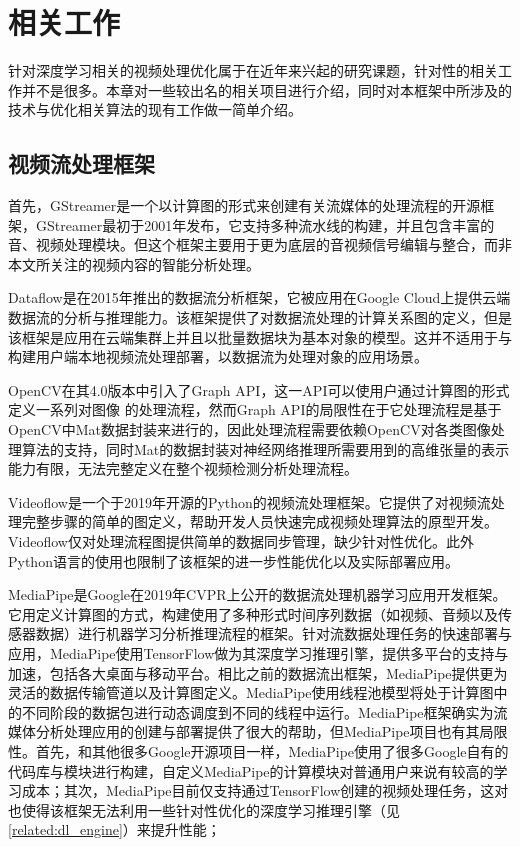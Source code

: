 
\chapter{相关工作}\label{related_work}
针对深度学习相关的视频处理优化属于在近年来兴起的研究课题，针对性的相关工作并不是很多。本章对一些较出名的相关项目进行介绍，同时对本框架中所涉及的技术与优化相关算法的现有工作做一简单介绍。

\section{视频流处理框架}
首先，GStreamer\cite{gstreamer}是一个以计算图的形式来创建有关流媒体的处理流程的开源框架，GStreamer最初于2001年发布，它支持多种流水线的构建，并且包含丰富的音、视频处理模块。但这个框架主要用于更为底层的音视频信号编辑与整合，而非本文所关注的视频内容的智能分析处理。\par
Dataflow\cite{akidau2015dataflow}是在2015年推出的数据流分析框架，它被应用在Google Cloud上提供云端数据流的分析与推理能力。该框架提供了对数据流处理的计算关系图的定义，但是该框架是应用在云端集群上并且以批量数据块为基本对象的模型。这并不适用于与构建用户端本地视频流处理部署，以数据流为处理对象的应用场景。\par 
OpenCV在其4.0版本中引入了Graph API\cite{matveev2018opencv}，这一API可以使用户通过计算图的形式定义一系列对图像
的处理流程，然而Graph API的局限性在于它处理流程是基于OpenCV中Mat数据封装来进行的，因此处理流程需要依赖OpenCV对各类图像处理算法的支持，同时Mat的数据封装对神经网络推理所需要用到的高维张量的表示能力有限，无法完整定义在整个视频检测分析处理流程。\par
Videoflow\cite{deArmas2019videoflow}是一个于2019年开源的Python的视频流处理框架。它提供了对视频流处理完整步骤的简单的图定义，帮助开发人员快速完成视频处理算法的原型开发。Videoflow仅对处理流程图提供简单的数据同步管理，缺少针对性优化。此外Python语言的使用也限制了该框架的进一步性能优化以及实际部署应用。\par
MediaPipe\cite{lugaresi2019mediapipe}是Google在2019年CVPR上公开的数据流处理机器学习应用开发框架。
它用定义计算图的方式，构建使用了多种形式时间序列数据（如视频、音频以及传感器数据）进行机器学习分析推理流程的框架。针对流数据处理任务的快速部署与应用，MediaPipe使用TensorFlow\cite{abadi2016tensorflow}做为其深度学习推理引擎，提供多平台的支持与加速，包括各大桌面与移动平台。相比之前的数据流出框架，MediaPipe提供更为灵活的数据传输管道以及计算图定义。MediaPipe使用线程池模型将处于计算图中的不同阶段的数据包进行动态调度到不同的线程中运行。MediaPipe框架确实为流媒体分析处理应用的创建与部署提供了很大的帮助，但MediaPipe项目也有其局限性。首先，和其他很多Google开源项目一样，MediaPipe使用了很多Google自有的代码库与模块进行构建，自定义MediaPipe的计算模块对普通用户来说有较高的学习成本；其次，MediaPipe目前仅支持通过TensorFlow创建的视频处理任务，这对也使得该框架无法利用一些针对性优化的深度学习推理引擎（见\ref{related:dl_engine}）来提升性能；

